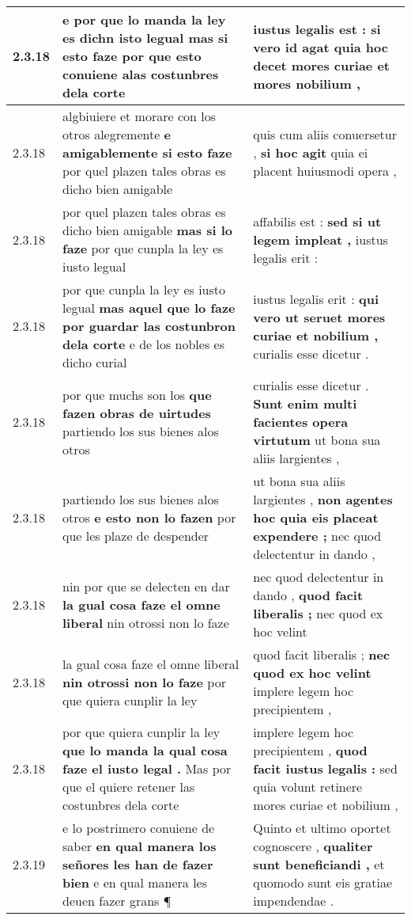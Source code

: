 \begin{tabular}{|p{1cm}|p{6.5cm}|p{6.5cm}|}
2.3.18 & e por que lo manda la ley es dichn isto legual \textbf{ mas si esto faze } por que esto conuiene alas costunbres dela corte & iustus legalis est : \textbf{ si vero id agat } quia hoc decet mores curiae et mores nobilium , \\\hline
2.3.18 & algbiuiere et morare con los otros alegremente \textbf{ e amigablemente si esto faze } por quel plazen tales obras es dicho bien amigable & quis cum aliis conuersetur , \textbf{ si hoc agit } quia ei placent huiusmodi opera , \\\hline
2.3.18 & por quel plazen tales obras es dicho bien amigable \textbf{ mas si lo faze } por que cunpla la ley es iusto legual & affabilis est : \textbf{ sed si ut legem impleat , } iustus legalis erit : \\\hline
2.3.18 & por que cunpla la ley es iusto legual \textbf{ mas aquel que lo faze por guardar las costunbron dela corte } e de los nobles es dicho curial & iustus legalis erit : \textbf{ qui vero ut seruet mores curiae et nobilium , } curialis esse dicetur . \\\hline
2.3.18 & por que muchs son los \textbf{ que fazen obras de uirtudes } partiendo los sus bienes alos otros & curialis esse dicetur . \textbf{ Sunt enim multi facientes opera virtutum } ut bona sua aliis largientes , \\\hline
2.3.18 & partiendo los sus bienes alos otros \textbf{ e esto non lo fazen } por que les plaze de despender & ut bona sua aliis largientes , \textbf{ non agentes hoc quia eis placeat expendere ; } nec quod delectentur in dando , \\\hline
2.3.18 & nin por que se delecten en dar \textbf{ la gual cosa faze el omne liberal } nin otrossi non lo faze & nec quod delectentur in dando , \textbf{ quod facit liberalis ; } nec quod ex hoc velint \\\hline
2.3.18 & la gual cosa faze el omne liberal \textbf{ nin otrossi non lo faze } por que quiera cunplir la ley & quod facit liberalis ; \textbf{ nec quod ex hoc velint } implere legem hoc precipientem , \\\hline
2.3.18 & por que quiera cunplir la ley \textbf{ que lo manda la qual cosa faze el iusto legal . } Mas por que el quiere retener las costunbres dela corte & implere legem hoc precipientem , \textbf{ quod facit iustus legalis : } sed quia volunt retinere mores curiae et nobilium , \\\hline
2.3.19 & e lo postrimero conuiene de saber \textbf{ en qual manera los señores les han de fazer bien } e en qual manera les deuen fazer grans ¶ & Quinto et ultimo oportet cognoscere , \textbf{ qualiter sunt beneficiandi , } et quomodo sunt eis gratiae impendendae . \\\hline

\end{tabular}
